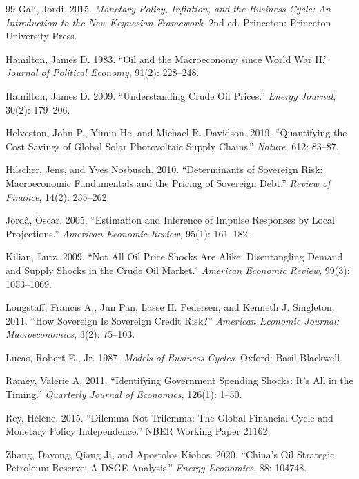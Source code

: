 \documentclass[12pt,a4paper]{article}
\begin{document}
\begin{thebibliography}{99}
Gal\'{i}, Jordi. 2015. \textit{Monetary Policy, Inflation, and the Business Cycle: An Introduction to the New Keynesian Framework}. 2nd ed. Princeton: Princeton University Press.

Hamilton, James D. 1983. ``Oil and the Macroeconomy since World War II.'' \textit{Journal of Political Economy}, 91(2): 228--248.

Hamilton, James D. 2009. ``Understanding Crude Oil Prices.'' \textit{Energy Journal}, 30(2): 179--206.

Helveston, John P., Yimin He, and Michael R. Davidson. 2019. ``Quantifying the Cost Savings of Global Solar Photovoltaic Supply Chains.'' \textit{Nature}, 612: 83--87.

Hilscher, Jens, and Yves Nosbusch. 2010. ``Determinants of Sovereign Risk: Macroeconomic Fundamentals and the Pricing of Sovereign Debt.'' \textit{Review of Finance}, 14(2): 235--262.

Jord\`{a}, \`{O}scar. 2005. ``Estimation and Inference of Impulse Responses by Local Projections.'' \textit{American Economic Review}, 95(1): 161--182.

Kilian, Lutz. 2009. ``Not All Oil Price Shocks Are Alike: Disentangling Demand and Supply Shocks in the Crude Oil Market.'' \textit{American Economic Review}, 99(3): 1053--1069.

Longstaff, Francis A., Jun Pan, Lasse H. Pedersen, and Kenneth J. Singleton. 2011. ``How Sovereign Is Sovereign Credit Risk?'' \textit{American Economic Journal: Macroeconomics}, 3(2): 75--103.

Lucas, Robert E., Jr. 1987. \textit{Models of Business Cycles}. Oxford: Basil Blackwell.

Ramey, Valerie A. 2011. ``Identifying Government Spending Shocks: It's All in the Timing.'' \textit{Quarterly Journal of Economics}, 126(1): 1--50.

Rey, H\'{e}l\`{e}ne. 2015. ``Dilemma Not Trilemma: The Global Financial Cycle and Monetary Policy Independence.'' NBER Working Paper 21162.

Zhang, Dayong, Qiang Ji, and Apostolos Kiohos. 2020. ``China's Oil Strategic Petroleum Reserve: A DSGE Analysis.'' \textit{Energy Economics}, 88: 104748.

\end{thebibliography}
\end{document}
